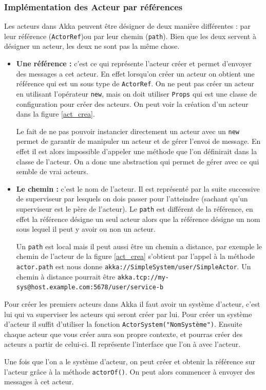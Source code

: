 \documentclass[12pt, a4paper]{article}
\begin{document}
\subsubsection{Implémentation des Acteur par références}
Les acteurs dans Akka peuvent être désigner de deux manière différentes : par leur référence (\texttt{ActorRef})ou par leur chemin (\texttt{path}). Bien que les deux servent à désigner un acteur, les deux ne sont pas la même chose. 
\begin{itemize}
\item \textbf{Une référence :} c'est ce qui représente l'acteur créer et permet d'envoyer des messages a cet acteur. En effet lorsqu'on créer un acteur on obtient une référence qui est un sous type de \texttt{ActorRef}. On ne peut pas créer un acteur en utilisant l'opérateur \texttt{new}, mais on doit utiliser \texttt{Props} qui est une classe de configuration pour créer des acteurs. On peut voir la création d'un acteur dans la figure \ref{act_crea}.
\par Le fait de ne pas pouvoir instancier directement un acteur avec un \texttt{new} permet de garantir de manipuler un acteur et de gérer l'envoi de message. En effet il est alors impossible d'appeler une méthode que l'on définirait dans la classe de l'acteur. On a donc une abstraction qui permet de gérer avec ce qui semble de vrai acteurs. 
\item \textbf{Le chemin :} c'est le nom de l'acteur. Il est représenté par la suite successive de superviseur par lesquels on dois passer pour l'atteindre (sachant qu'un superviseur est le père de l'acteur). Le \texttt{path} est différent de la référence, en effet la référence désigne un seul acteur alors que la référence désigne un nom sous lequel il peut y avoir ou non un acteur.
\par Un \texttt{path} est local mais il peut aussi être un chemin a distance, par exemple le chemin de l'acteur de la figure \ref{act_crea} s'obtient par l'appel à la méthode \texttt{actor.path} est nous donne \texttt{akka://SimpleSystem/user/SimpleActor}. Un chemin à distance pourrait être \texttt{akka.tcp://my-sys@host.example.com:5678/user/service-b}
\newline
\end{itemize}
\par 
Pour créer les premiers acteurs dans Akka il faut avoir un système d'acteur, c'est lui qui va superviser les acteurs qui seront créer par lui. Pour créer un système d'acteur il suffit d'utiliser la fonction \texttt{ActorSystem("NomSystème")}. Ensuite chaque acteur que vous créer aura son propre contexte, et pourras créer des acteurs a partir de celui-ci. Il représente l'interface que l'on à avec l'acteur. 
\par Une fois que l'on a le système d'acteur, on peut créer et obtenir la référence sur l'acteur grâce à la méthode \texttt{actorOf()}. On peut alors commencer à envoyer des messages à cet acteur.
\end{document}
